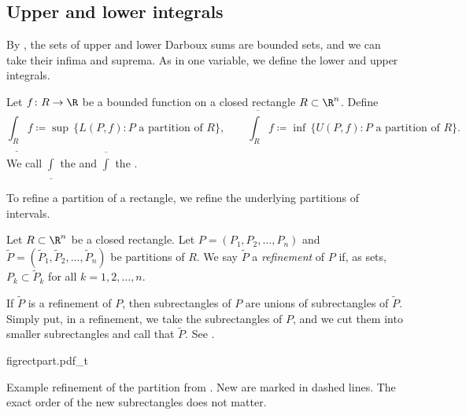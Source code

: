 \subsection{Upper and lower integrals}

By , the sets of upper and lower Darboux sums
are bounded sets, and we can take
their infima and suprema.  As in one variable, we define the lower and upper
integrals.

\begin{defn}
Let $f \colon R \to \R$ be a bounded function on a closed rectangle $R \subset
\R^n$.
Define
\begin{equation*}
\underline{\int_R} f
\coloneqq \sup \, \bigl\{ L(P,f) : P \text{ a partition of } R \bigr\} , 
\qquad
\overline{\int_R} f
\coloneqq \inf \, \bigl\{ U(P,f) : P \text{ a partition of } R \bigr\} .
\end{equation*}
We call $\underline{\int}$ the
\emph{} and
$\overline{\int}$ the \emph{}.
\end{defn}

To refine a partition of a rectangle, we refine
the underlying partitions of intervals.

\begin{defn}
Let $R \subset \R^n$ be a closed rectangle.
Let $P = ( P_1, P_2, \ldots, P_n )$
and $\widetilde{P} = ( \widetilde{P}_1, \widetilde{P}_2, \ldots, \widetilde{P}_n )$
be partitions of $R$.  We say $\widetilde{P}$ a
\emph{refinement} of $P$
if, as sets, $P_k \subset \widetilde{P}_k$ for all $k = 1,2,\ldots,n$.
\end{defn}

If $\widetilde{P}$ is a refinement of $P$,
then subrectangles of $P$ are unions of subrectangles of $\widetilde{P}$.
Simply put, in a refinement, we take the subrectangles of $P$,
and we cut them into smaller subrectangles and call that $\widetilde{P}$.
See .

\begin{myfigureht}
{figrectpart.pdf_t}
\caption{Example refinement of the partition from .
New  are marked in
dashed lines.  The exact order of the new subrectangles does not
matter.\label{mv:figrectpart}}
\end{myfigureht}

